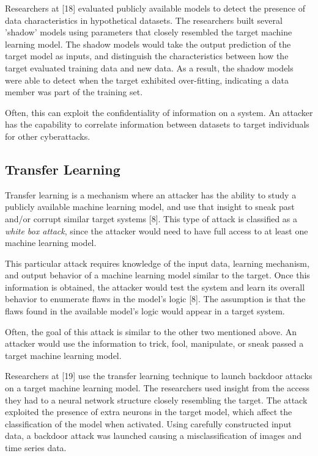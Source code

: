 \documentclass[11pt,conference]{IEEEtran}
\begin{document}
Researchers at [18] evaluated publicly available models to detect the
presence of data characteristics in hypothetical datasets. The researchers
built several 'shadow' models using parameters that closely resembled the target
machine learning model. The shadow models would take the output prediction of
the target model as inputs, and distinguish the characteristics between how the
target evaluated training data and new data. As a result, the shadow models
were able to detect when the target exhibited over-fitting, indicating a data
member was part of the training set.

Often, this can exploit the confidentiality of information on a system. An
attacker has the capability to correlate information between datasets to target
individuals for other cyberattacks.


\subsection{Transfer Learning}
Transfer learning is a mechanism where an attacker has the ability to study a
publicly available machine learning model, and use that insight to sneak past
and/or corrupt similar target systems [8]. This type of attack is classified as a
\emph{white box attack}, since the attacker would need to have full access to
at least one machine learning model.

This particular attack requires knowledge of the
input data, learning mechanism, and output behavior of a machine learning model
similar to the target. Once this information is obtained, the attacker would
test the system and learn its overall behavior to enumerate flaws in the
model's logic [8]. The assumption is that the flaws found in the available model's
logic would appear in a target system.

Often, the goal of this attack is similar to the other two mentioned above. An
attacker would use the information to trick, fool, manipulate, or sneak passed
a target machine learning model.

Researchers at [19] use the transfer learning technique to launch backdoor
attacks on a target machine learning model. The researchers used insight from
the access they had to a
neural network structure closely resembling the target. The attack
exploited the presence of extra neurons in the target model, which affect the
classification of the model when activated. Using carefully constructed input
data, a backdoor attack was launched causing a misclassification of images and
time series data.
\end{document}
